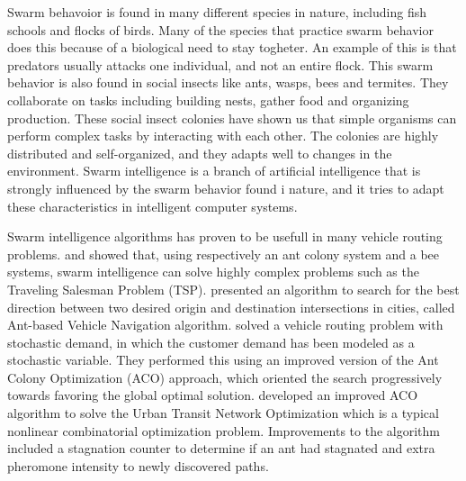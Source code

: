 

Swarm behavoior is found in many different species in nature, including fish schools and flocks of birds. Many of the species that practice swarm behavior does this because of a biological need to stay togheter. An example of this is that predators usually attacks one individual, and not an entire flock. This swarm behavior is also found in social insects like ants, wasps, bees and termites. They collaborate on tasks including building nests, gather food and organizing production. These social insect colonies have shown us that simple organisms can perform complex tasks by interacting with each other. The colonies are highly distributed and self-organized, and they adapts well to changes in the environment. Swarm intelligence \citep{beni89} is a branch of artificial intelligence that is strongly influenced by the swarm behavior found i nature, and it tries to adapt these characteristics in intelligent computer systems.


Swarm intelligence algorithms has proven to be usefull in many vehicle routing problems. \citet{dorigo97} and \citet{lucic03} showed that, using respectively an ant colony system and a bee systems, swarm intelligence can solve highly complex problems such as the Traveling Salesman Problem (TSP). \citet{salehi-nezhad07} presented an algorithm to search for the best direction between two desired origin and destination intersections in cities, called Ant-based Vehicle Navigation algorithm. \citet{tripathi09} solved a vehicle routing problem with stochastic demand, in which the customer demand has been modeled as a stochastic variable. They performed this using an improved version of the Ant Colony Optimization (ACO) approach, which oriented the search progressively towards favoring the global optimal solution. \citet{jiang10} developed an improved ACO algorithm to solve the Urban Transit Network Optimization which is a typical nonlinear combinatorial optimization problem. Improvements to the algorithm included a stagnation counter to determine if an ant had stagnated and extra pheromone intensity to newly discovered paths. %